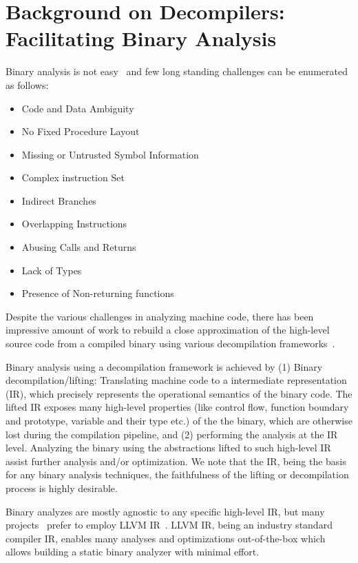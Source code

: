 \chapter{Background on Decompilers: Facilitating Binary Analysis}\label{sec:decompilers}

Binary analysis is not easy~\cite{Meng:2016} and few long standing
challenges can be enumerated as follows:
\begin{itemize}
    \item Code and Data Ambiguity
    \item No Fixed Procedure Layout
    \item Missing or Untrusted Symbol Information
    \item Complex instruction Set
    \item Indirect Branches
    \item Overlapping Instructions
    \item Abusing Calls and Returns
    \item Lack of Types
    \item Presence of Non-returning functions
\end{itemize}

Despite the various challenges in analyzing machine code, there has been
impressive amount of work to rebuild a close approximation of the high-level
source code from a compiled binary using various decompilation
frameworks~\cite{McSema:Recon14,Remill,Angr1,BAP:CAV11,Radare2,FCD,BitBlaze:2008,hexray,Fokin:2011,eschulte2018bed,katz2018rnn,Schwartz:2013,IDA,mctoll,revgen}.

Binary analysis using a decompilation framework is achieved by (1) Binary
decompilation/lifting: Translating machine code to a intermediate
representation (IR), which precisely represents the operational semantics of
the binary code. The lifted IR exposes many high-level properties (like control
    flow, function boundary and prototype, variable and their type etc.) of the
the binary, which are otherwise lost during the compilation pipeline, and (2)
  performing the analysis at the IR level.  Analyzing the binary using the
  abstractions lifted to such high-level IR assist further analysis and/or
  optimization. We note that the IR, being the basis for any binary analysis
  techniques, the faithfulness of the lifting or decompilation process is
  highly desirable. 

Binary analyzes are mostly agnostic to any specific high-level IR, but many
projects~\cite{McSema:Recon14,Remill,FCD,reopt,mctoll} prefer to employ LLVM
IR~\cite{Lattner:2004}. LLVM IR, being an industry standard compiler IR,
  enables many analyses and optimizations out-of-the-box which allows building
  a static binary analyzer with minimal effort.

